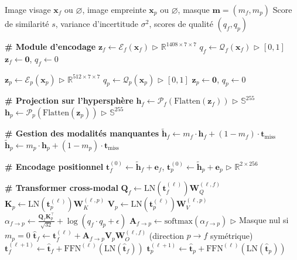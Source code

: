 \documentclass[12pt,a4paper]{report}
\newcommand{\TO}{\textbf{to}}
\begin{document}
\begin{algorithm}[htbp]
\caption{Forward pass de l'UFM-Transformer}
\label{alg:forward}
\begin{algorithmic}[1]
\REQUIRE Image visage $\mathbf{x}_f$ ou $\varnothing$, image empreinte $\mathbf{x}_p$ ou $\varnothing$, masque $\mathbf{m} = (m_f, m_p)$
\ENSURE Score de similarit\'{e} $s$, variance d'incertitude $\sigma^2$, scores de qualit\'{e} $(q_f, q_p)$

\STATE \textbf{\# Module d'encodage}
    \STATE $\mathbf{z}_f \leftarrow \mathcal{E}_f(\mathbf{x}_f)$ \hfill $\triangleright$ $\mathbb{R}^{1408 \times 7 \times 7}$
    \STATE $q_f \leftarrow \mathcal{Q}_f(\mathbf{x}_f)$ \hfill $\triangleright$ $[0, 1]$
\ELSE
    \STATE $\mathbf{z}_f \leftarrow \mathbf{0}$, $q_f \leftarrow 0$
\ENDIF

    \STATE $\mathbf{z}_p \leftarrow \mathcal{E}_p(\mathbf{x}_p)$ \hfill $\triangleright$ $\mathbb{R}^{512 \times 7 \times 7}$
    \STATE $q_p \leftarrow \mathcal{Q}_p(\mathbf{x}_p)$ \hfill $\triangleright$ $[0, 1]$
\ELSE
    \STATE $\mathbf{z}_p \leftarrow \mathbf{0}$, $q_p \leftarrow 0$
\ENDIF

\STATE \textbf{\# Projection sur l'hypersph\`{e}re}
\STATE $\mathbf{h}_f \leftarrow \mathcal{P}_f(\text{Flatten}(\mathbf{z}_f))$ \hfill $\triangleright$ $\mathbb{S}^{255}$
\STATE $\mathbf{h}_p \leftarrow \mathcal{P}_p(\text{Flatten}(\mathbf{z}_p))$ \hfill $\triangleright$ $\mathbb{S}^{255}$

\STATE \textbf{\# Gestion des modalit\'{e}s manquantes}
\STATE $\tilde{\mathbf{h}}_f \leftarrow m_f \cdot \mathbf{h}_f + (1 - m_f) \cdot \mathbf{t}_{\text{miss}}$
\STATE $\tilde{\mathbf{h}}_p \leftarrow m_p \cdot \mathbf{h}_p + (1 - m_p) \cdot \mathbf{t}_{\text{miss}}$

\STATE \textbf{\# Encodage positionnel}
\STATE $\mathbf{t}_f^{(0)} \leftarrow \tilde{\mathbf{h}}_f + \mathbf{e}_f$, $\mathbf{t}_p^{(0)} \leftarrow \tilde{\mathbf{h}}_p + \mathbf{e}_p$ \hfill $\triangleright$ $\mathbb{R}^{2 \times 256}$

\STATE \textbf{\# Transformer cross-modal}
\FOR{$\ell = 0$ \TO $L-1$}
    \STATE $\mathbf{Q}_f \leftarrow \text{LN}(\mathbf{t}_f^{(\ell)}) \mathbf{W}_Q^{(\ell,f)}$
    \STATE $\mathbf{K}_p \leftarrow \text{LN}(\mathbf{t}_p^{(\ell)}) \mathbf{W}_K^{(\ell,p)}$
    \STATE $\mathbf{V}_p \leftarrow \text{LN}(\mathbf{t}_p^{(\ell)}) \mathbf{W}_V^{(\ell,p)}$
    \STATE $\alpha_{f \rightarrow p} \leftarrow \frac{\mathbf{Q}_f \mathbf{K}_p^\top}{\sqrt{32}} + \log(q_f \cdot q_p + \epsilon)$
    \STATE $\mathbf{A}_{f \rightarrow p} \leftarrow \text{softmax}(\alpha_{f \rightarrow p})$ \hfill $\triangleright$ Masque nul si $m_p = 0$
    \STATE $\hat{\mathbf{t}}_f \leftarrow \mathbf{t}_f^{(\ell)} + \mathbf{A}_{f \rightarrow p} \mathbf{V}_p \mathbf{W}_O^{(\ell,f)}$
    \STATE (direction $p \rightarrow f$ sym\'{e}trique)
    \STATE $\mathbf{t}_f^{(\ell+1)} \leftarrow \hat{\mathbf{t}}_f + \text{FFN}^{(\ell)}(\text{LN}(\hat{\mathbf{t}}_f))$
    \STATE $\mathbf{t}_p^{(\ell+1)} \leftarrow \hat{\mathbf{t}}_p + \text{FFN}^{(\ell)}(\text{LN}(\hat{\mathbf{t}}_p))$
\ENDFOR


\end{algorithmic}
\end{algorithm}
\end{document}
